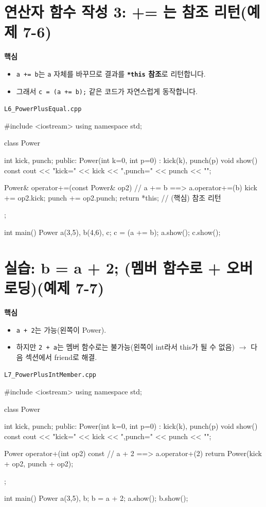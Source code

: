 \documentclass[11pt,a4paper]{article}
\newcommand{\filetag}[1]{\texttt{\color{Accent}#1}}
\begin{document}
\section{연산자 함수 작성 3: += 는 참조 리턴(예제 7-6)}
\begin{GoalBox}
\textbf{핵심}
\begin{itemize}[leftmargin=18pt]
  \item \texttt{a += b}는 \texttt{a} 자체를 바꾸므로 결과를 \textbf{\texttt{*this} 참조}로 리턴합니다.
  \item 그래서 \texttt{c = (a += b);} 같은 코드가 자연스럽게 동작합니다.
\end{itemize}
\end{GoalBox}

\noindent\filetag{L6\_PowerPlusEqual.cpp}
\begin{cppcode}
#include <iostream>
using namespace std;

class Power {
    int kick, punch;
public:
    Power(int k=0, int p=0) : kick(k), punch(p) {}
    void show() const { cout << "kick=" << kick << ",punch=" << punch << "\n"; }

    Power& operator+=(const Power& op2) { // a += b  ==> a.operator+=(b)
        kick += op2.kick;
        punch += op2.punch;
        return *this; // (핵심) 참조 리턴
    }
};

int main() {
    Power a(3,5), b(4,6), c;
    c = (a += b);
    a.show();
    c.show();
}
\end{cppcode}

\section{실습: b = a + 2; (멤버 함수로 + 오버로딩)(예제 7-7)}
\begin{GoalBox}
\textbf{핵심}
\begin{itemize}[leftmargin=18pt]
  \item \texttt{a + 2}는 가능(왼쪽이 Power).
  \item 하지만 \texttt{2 + a}는 멤버 함수로는 불가능(왼쪽이 int라서 this가 될 수 없음) $\rightarrow$ 다음 섹션에서 friend로 해결.
\end{itemize}
\end{GoalBox}

\noindent\filetag{L7\_PowerPlusIntMember.cpp}
\begin{cppcode}
#include <iostream>
using namespace std;

class Power {
    int kick, punch;
public:
    Power(int k=0, int p=0) : kick(k), punch(p) {}
    void show() const { cout << "kick=" << kick << ",punch=" << punch << "\n"; }

    Power operator+(int op2) const { // a + 2  ==> a.operator+(2)
        return Power(kick + op2, punch + op2);
    }
};

int main() {
    Power a(3,5), b;
    b = a + 2;
    a.show();
    b.show();
}
\end{cppcode}
\end{document}
